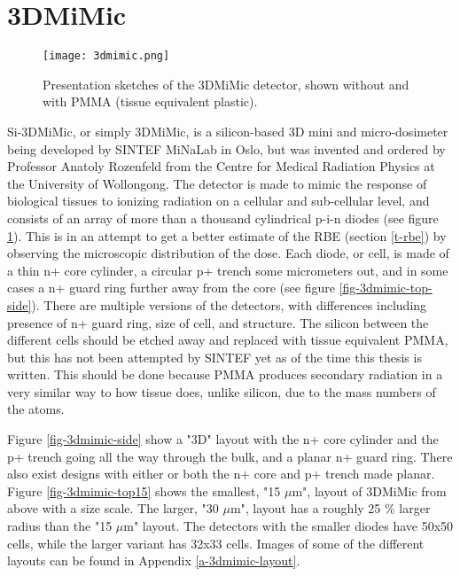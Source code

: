 \documentclass[../main/thesis.tex]{subfiles}
\begin{document}
\section{3DMiMic}
\label{3d-3d}

\begin{figure}%
	\centering
	\texttt{[image: 3dmimic.png]}
	\caption{Presentation sketches of the 3DMiMic detector, shown without and with PMMA (tissue equivalent plastic). \citep{Trento2015}}
	\label{fig-3dmimic}
\end{figure}

Si-3DMiMic, or simply 3DMiMic, is a silicon-based 3D mini and micro-dosimeter being developed by SINTEF MiNaLab in Oslo, but was invented and ordered by Professor Anatoly Rozenfeld from the Centre for Medical Radiation Physics at the University of Wollongong. The detector is made to mimic the response of biological tissues to ionizing radiation on a cellular and sub-cellular level, and consists of an array of more than a thousand cylindrical p-i-n diodes (see figure \ref{fig-3dmimic}). This is in an attempt to get a better estimate of the \acrfull{RBE} (section \ref{t-rbe}) by observing the microscopic distribution of the dose. Each diode, or cell, is made of a thin n+ core cylinder, a circular p+ trench some micrometers out, and in some cases a n+ guard ring further away from the core (see figure \ref{fig-3dmimic-top-side}). There are multiple versions of the detectors, with differences including presence of n+ guard ring, size of cell, and structure. The silicon between the different cells should be etched away and replaced with tissue equivalent \gls{PMMA}, but this has not been attempted by SINTEF yet as of the time this thesis is written. This should be done because \gls{PMMA} produces secondary radiation in a very similar way to how tissue does, unlike silicon, due to the mass numbers of the atoms. 


Figure \ref{fig-3dmimic-side} show a "3D" layout with the n+ core cylinder and the p+ trench going all the way through the bulk, and a planar n+ guard ring. There also exist designs with either or both the n+ core and p+ trench made planar. Figure \ref{fig-3dmimic-top15} shows the smallest, "15 $\mu$m", layout of 3DMiMic from above with a size scale. The larger, "30 $\mu$m", layout has a roughly 25 \% larger radius than the "15 $\mu$m" layout. The detectors with the smaller diodes have 50x50 cells, while the larger variant has 32x33 cells. Images of some of the different layouts can be found in Appendix \ref{a-3dmimic-layout}.
\end{document}

